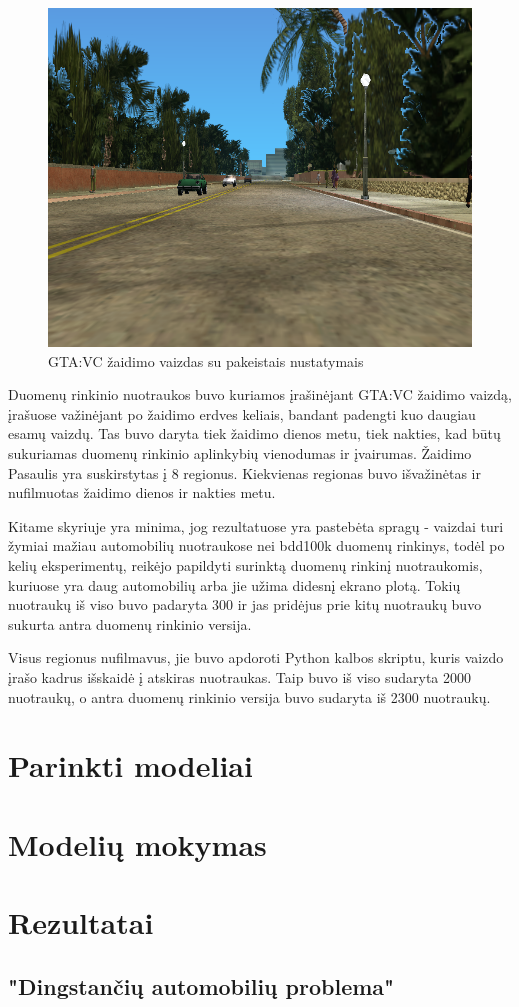 \documentclass{VUMIFPSkursinis}
\begin{document}
\begin{figure}[H]
    \centering
    \includegraphics[scale=0.5]{img/apdorotas_pvz}
    \caption{GTA:VC žaidimo vaizdas su pakeistais nustatymais}
    \label{img:mlp}
\end{figure}

Duomenų rinkinio nuotraukos buvo kuriamos įrašinėjant GTA:VC žaidimo vaizdą, įrašuose važinėjant po žaidimo erdves keliais, bandant padengti kuo daugiau esamų vaizdų. Tas buvo daryta tiek žaidimo dienos metu, tiek nakties, kad būtų sukuriamas duomenų rinkinio aplinkybių vienodumas ir įvairumas. Žaidimo Pasaulis yra suskirstytas į 8 regionus. Kiekvienas regionas buvo išvažinėtas ir nufilmuotas žaidimo dienos ir nakties metu.

Kitame skyriuje yra minima, jog rezultatuose yra pastebėta spragų - vaizdai turi žymiai mažiau automobilių nuotraukose nei bdd100k duomenų rinkinys, todėl po kelių eksperimentų, reikėjo papildyti surinktą duomenų rinkinį nuotraukomis, kuriuose yra daug automobilių arba jie užima didesnį ekrano plotą. Tokių nuotraukų iš viso buvo padaryta 300 ir jas pridėjus prie kitų nuotraukų buvo sukurta antra duomenų rinkinio versija.

Visus regionus nufilmavus, jie buvo apdoroti Python kalbos skriptu, kuris vaizdo įrašo kadrus išskaidė į atskiras nuotraukas. Taip buvo iš viso sudaryta 2000 nuotraukų, o antra duomenų rinkinio versija buvo sudaryta iš 2300 nuotraukų.

\section{Parinkti modeliai}

\section{Modelių mokymas}

\section{Rezultatai}
\subsection{"Dingstančių automobilių problema"}
\end{document}
